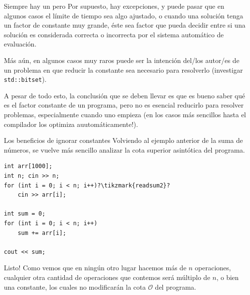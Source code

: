 \documentclass{beamer}
\begin{document}
    \begin{frame}{Siempre hay un pero}
        Por supuesto, hay excepciones, y puede pasar que en algunos casos el límite de tiempo sea algo ajustado, o cuando una solución tenga un factor de constante muy grande, éste sea factor que pueda decidir entre si una solución es considerada correcta o incorrecta por el sistema automático de evaluación. \pause \vspace{8pt}

        Más aún, en algunos casos muy raros puede ser la intención del/los autor/es de un problema en que reducir la constante sea necesario para resolverlo (investigar \texttt{std::bitset}). \pause \vspace{8pt}

        A pesar de todo esto, la conclusión que se deben llevar es que es bueno saber qué es el factor constante de un programa, pero no es esencial reducirlo para resolver problemas, especialmente cuando uno empieza (en los casos más sencillos hasta el compilador los optimiza auutomáticamente!).
    \end{frame}

    \begin{frame}[fragile]{Los beneficios de ignorar constantes}
        Volviendo al ejemplo anterior de la suma de números, se vuelve más sencillo analizar la cota superior asintótica del programa. \pause \vspace{8pt}

        \begin{verbatim}
int arr[1000];
int n; cin >> n;
for (int i = 0; i < n; i++)?\tikzmark{readsum2}?
    cin >> arr[i];

int sum = 0;
for (int i = 0; i < n; i++)
    sum += arr[i];

cout << sum;
        \end{verbatim}

        \pause

        \pause

        Listo! Como vemos que en ningún otro lugar hacemos más de $n$ operaciones, cualquier otra cantidad de operaciones que contemos será múltiplo de $n$, o bien una constante, los cuales no modificarán la cota $\mathcal{O}$ del programa.
    \end{frame}
\end{document}
